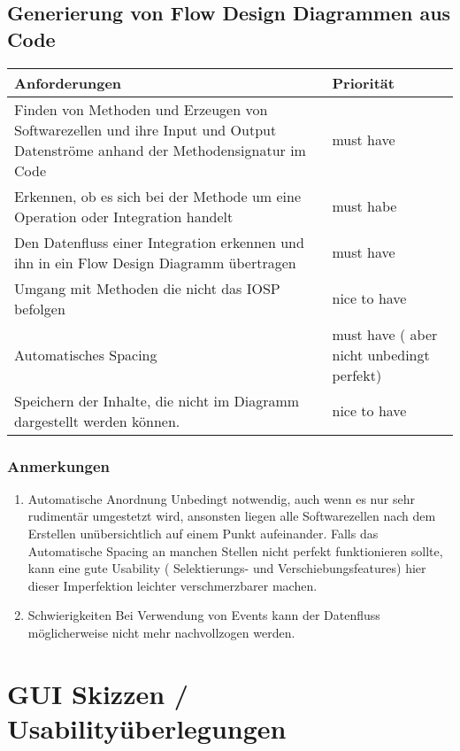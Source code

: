 \documentclass[11pt]{article}
\begin{document}
\subsection{Generierung von Flow Design Diagrammen aus Code}
\label{sec:orgheadline20}

\begin{center}
\begin{tabular}{ll}
Anforderungen & Priorität\\
\hline
Finden von Methoden und Erzeugen von Softwarezellen und ihre Input und Output Datenströme anhand der Methodensignatur im Code & must have\\
Erkennen, ob es sich bei der Methode um eine Operation oder Integration handelt & must habe\\
Den Datenfluss einer Integration erkennen und ihn in ein Flow Design Diagramm übertragen & must have\\
Umgang mit Methoden die nicht das IOSP befolgen & nice to have\\
Automatisches Spacing & must have ( aber nicht unbedingt perfekt)\\
Speichern der Inhalte, die nicht im Diagramm dargestellt werden können. & nice to have\\
\end{tabular}
\end{center}

\subsubsection{Anmerkungen}
\label{sec:orgheadline19}
\begin{enumerate}
\item Automatische Anordnung
\label{sec:orgheadline17}
Unbedingt notwendig, auch wenn es nur sehr rudimentär umgestetzt wird, ansonsten liegen
alle Softwarezellen nach dem Erstellen unübersichtlich auf einem Punkt aufeinander.
Falls das Automatische Spacing an manchen Stellen nicht perfekt funktionieren
sollte, kann eine gute Usability ( Selektierungs- und Verschiebungsfeatures)
hier dieser Imperfektion leichter verschmerzbarer machen.

\item Schwierigkeiten
\label{sec:orgheadline18}
Bei Verwendung von Events kann der Datenfluss möglicherweise nicht mehr
nachvollzogen werden.
\end{enumerate}


\section{GUI Skizzen / Usabilityüberlegungen}
\label{sec:orgheadline28}
\end{document}
